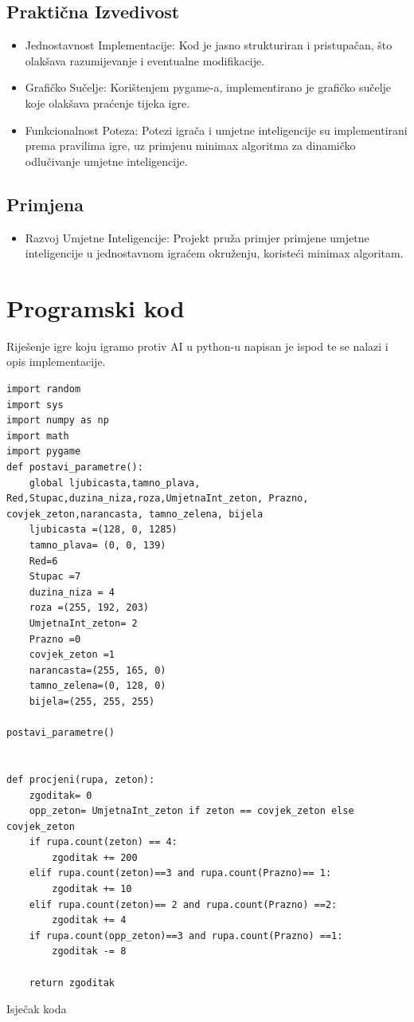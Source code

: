 \documentclass[]{foi}
\begin{document}
\section{Praktična Izvedivost}
\begin{itemize}
    \item Jednostavnost Implementacije: Kod je jasno strukturiran i pristupačan, što olakšava razumijevanje i eventualne modifikacije.
    \item Grafičko Sučelje: Korištenjem pygame-a, implementirano je grafičko sučelje koje olakšava praćenje tijeka igre.
    \item Funkcionalnost Poteza: Potezi igrača i umjetne inteligencije su implementirani prema pravilima igre, uz primjenu minimax algoritma za dinamičko odlučivanje umjetne inteligencije.
\end{itemize}
\section{Primjena}
\begin{itemize}
    \item Razvoj Umjetne Inteligencije: Projekt pruža primjer primjene umjetne inteligencije u jednostavnom igraćem okruženju, koristeći minimax algoritam.
\end{itemize}






\chapter{Programski kod}

Riješenje igre koju igramo protiv AI u python-u napisan je ispod te se nalazi i opis implementacije.



\begin{listing}
    \begin{verbatim}
import random
import sys
import numpy as np
import math
import pygame
def postavi_parametre():
    global ljubicasta,tamno_plava, Red,Stupac,duzina_niza,roza,UmjetnaInt_zeton, Prazno, covjek_zeton,narancasta, tamno_zelena, bijela
    ljubicasta =(128, 0, 1285)
    tamno_plava= (0, 0, 139)
    Red=6
    Stupac =7
    duzina_niza = 4
    roza =(255, 192, 203)
    UmjetnaInt_zeton= 2
    Prazno =0
    covjek_zeton =1
    narancasta=(255, 165, 0)
    tamno_zelena=(0, 128, 0)
    bijela=(255, 255, 255)

postavi_parametre()


def procjeni(rupa, zeton): 
    zgoditak= 0
    opp_zeton= UmjetnaInt_zeton if zeton == covjek_zeton else covjek_zeton
    if rupa.count(zeton) == 4:
        zgoditak += 200
    elif rupa.count(zeton)==3 and rupa.count(Prazno)== 1:
        zgoditak += 10
    elif rupa.count(zeton)== 2 and rupa.count(Prazno) ==2:
        zgoditak += 4
    if rupa.count(opp_zeton)==3 and rupa.count(Prazno) ==1:
        zgoditak -= 8

    return zgoditak
    \end{verbatim}
    \caption{Isječak koda}
    \label{lst:dva}
\end{listing}
\end{document}
